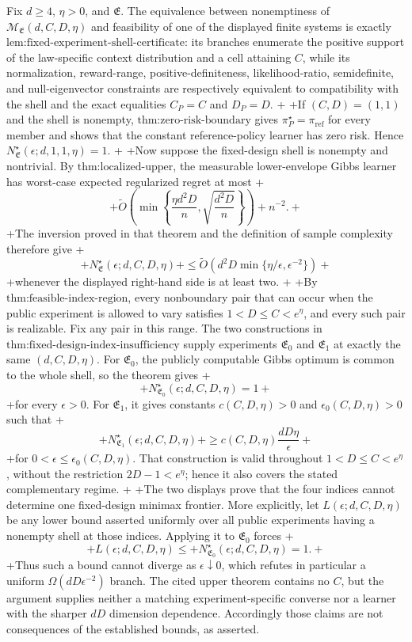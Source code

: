 Fix \(d\ge4\), \(\eta>0\), and \(\mathfrak E\). The equivalence between nonemptiness of \(\mathcal M_{\mathfrak E}(d,C,D,\eta)\) and feasibility of one of the displayed finite systems is exactly \(\text{lem:fixed-experiment-shell-certificate}\): its branches enumerate the positive support of the law-specific context distribution and a cell attaining \(C\), while its normalization, reward-range, positive-definiteness, likelihood-ratio, semidefinite, and null-eigenvector constraints are respectively equivalent to compatibility with the shell and the exact equalities \(C_P=C\) and \(D_P=D\).
+
+If \((C,D)=(1,1)\) and the shell is nonempty, \(\text{thm:zero-risk-boundary}\) gives \(\pi_P^\star=\pi_{\mathrm{ref}}\) for every member and shows that the constant reference-policy learner has zero risk. Hence \(N^\star_{\mathfrak E}(\epsilon;d,1,1,\eta)=1\).
+
+Now suppose the fixed-design shell is nonempty and nontrivial. By \(\text{thm:localized-upper}\), the measurable lower-envelope Gibbs learner has worst-case expected regularized regret at most
+\[
+\widetilde O\!\left(\min\left\{\frac{\eta d^2D}{n},\sqrt{\frac{d^2D}{n}}\right\}\right)+n^{-2}.
+\]
+The inversion proved in that theorem and the definition of sample complexity therefore give
+\[
+N^\star_{\mathfrak E}(\epsilon;d,C,D,\eta)
+\le\widetilde O\!\left(d^2D\min\{\eta/\epsilon,\epsilon^{-2}\}\right)
+\]
+whenever the displayed right-hand side is at least two.
+
+By \(\text{thm:feasible-index-region}\), every nonboundary pair that can occur when the public experiment is allowed to vary satisfies \(1<D\le C<e^\eta\), and every such pair is realizable. Fix any pair in this range. The two constructions in \(\text{thm:fixed-design-index-insufficiency}\) supply experiments \(\mathfrak E_0\) and \(\mathfrak E_1\) at exactly the same \((d,C,D,\eta)\). For \(\mathfrak E_0\), the publicly computable Gibbs optimum is common to the whole shell, so the theorem gives
+\[
+N^\star_{\mathfrak E_0}(\epsilon;d,C,D,\eta)=1
+\]
+for every \(\epsilon>0\). For \(\mathfrak E_1\), it gives constants \(c(C,D,\eta)>0\) and \(\epsilon_0(C,D,\eta)>0\) such that
+\[
+N^\star_{\mathfrak E_1}(\epsilon;d,C,D,\eta)
+\ge c(C,D,\eta)\frac{dD\eta}{\epsilon}
+\]
+for \(0<\epsilon\le\epsilon_0(C,D,\eta)\). That construction is valid throughout \(1<D\le C<e^\eta\), without the restriction \(2D-1<e^\eta\); hence it also covers the stated complementary regime.
+
+The two displays prove that the four indices cannot determine one fixed-design minimax frontier. More explicitly, let \(L(\epsilon;d,C,D,\eta)\) be any lower bound asserted uniformly over all public experiments having a nonempty shell at those indices. Applying it to \(\mathfrak E_0\) forces
+\[
+L(\epsilon;d,C,D,\eta)\le
+N^\star_{\mathfrak E_0}(\epsilon;d,C,D,\eta)=1.
+\]
+Thus such a bound cannot diverge as \(\epsilon\downarrow0\), which refutes in particular a uniform \(\Omega(dD\epsilon^{-2})\) branch. The cited upper theorem contains no \(C\), but the argument supplies neither a matching experiment-specific converse nor a learner with the sharper \(dD\) dimension dependence. Accordingly those claims are not consequences of the established bounds, as asserted.
